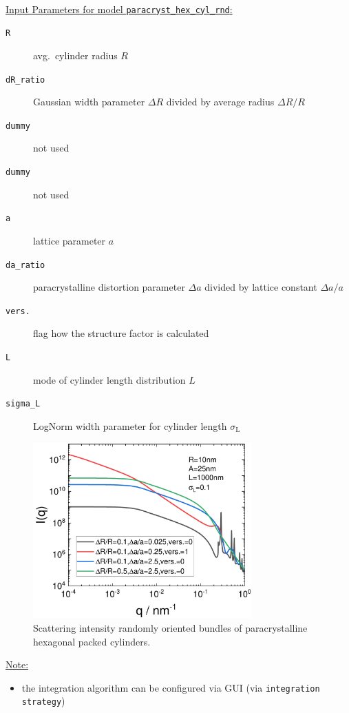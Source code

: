 \hspace{1pt}\\
\uline{Input Parameters for model \texttt{paracryst\_hex\_cyl\_rnd}:}\\
\begin{description}
\item[\texttt{R}] avg.\ cylinder radius $R$
\item[\texttt{dR\_ratio}] Gaussian width parameter $\Delta R$ divided by average radius $\Delta R/R$
\item[\texttt{dummy}] not used
\item[\texttt{dummy}] not used
\item[\texttt{a}] lattice parameter $a$
\item[\texttt{da\_ratio}] paracrystalline distortion parameter $\Delta a$ divided by lattice constant $\Delta a/a$
\item[\texttt{vers.}] flag how the structure factor is calculated
\item[\texttt{L}] mode of cylinder length distribution $L$
\item[\texttt{sigma\_L}] LogNorm width parameter for cylinder length $\sigma_\mathrm{L}$
\end{description}

\begin{figure}[htb]
\begin{center}
\includegraphics[width=0.75\textwidth]{../images/form_factor/cylindrical_obj/paracrystHEXcyl_rnd.pdf}
\end{center}
\caption{Scattering intensity randomly oriented bundles of paracrystalline hexagonal packed cylinders.}
\label{fig:paracrystHEXcyl_rndIQ}
\end{figure}

\noindent\uline{Note:}
\begin{itemize}
\item the integration algorithm can be configured via GUI (via \texttt{integration strategy})
\end{itemize}
\clearpage

